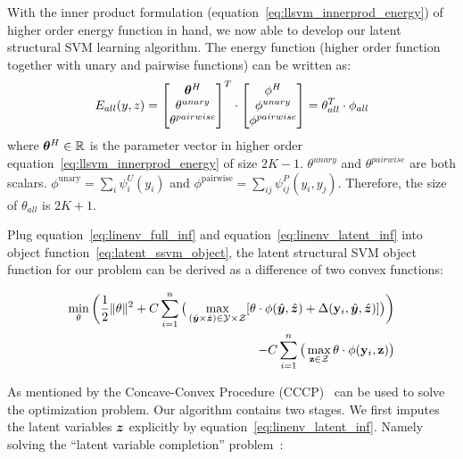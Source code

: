 With the inner product formulation
(equation~\eqref{eq:llsvm_innerprod_energy}) of higher order
energy function in hand, we now able to develop our latent
structural SVM learning algorithm. The energy function (higher
order function together with unary and pairwise functions) can be
written as:
\begin{equation}
  E_{all}(y,z) = \begin{bmatrix}
    {\bm{\theta}}^H\\
    \theta^{unary}\\
    \theta^{pairwise}
  \end{bmatrix}^T 
  \cdot \begin{bmatrix}
    \phi^H\\
    \phi^{unary}\\
    \phi^{pairwise}
  \end{bmatrix}=\theta_{all}^T\cdot\phi_{all}
\end{equation}
where ${\bm{\theta}}^H\in {\mathbb{R}}$ is the parameter vector in higher
order equation~\eqref{eq:llsvm_innerprod_energy} of size $2K-1$.
$\theta^{unary}$ and $\theta^{pairwise}$ are both scalars.
$\phi^\textrm{unary} = \sum_i \psi^U_i\!(y_i)$ and
$\phi^\textrm{pairwise} = \sum_{ij} \psi^P_{ij}(y_i, y_j)$.
Therefore, the size of $\theta_{all}$ is $2K+1$.

Plug equation~\eqref{eq:linenv_full_inf} and
equation~\eqref{eq:linenv_latent_inf} into object
function~\eqref{eq:latent_ssvm_object}, the latent structural SVM
object function for our problem can be derived as a difference of
two convex functions:

\begin{align}
\label{eq:lssvm_object}
  \min_\theta\bigg(\frac{1}{2}\|\theta\|^2+
  C\sum_{i=1}^{n}\big(\max_{(\hat{{\bm{y}}} \times
  \hat{{\bm{z}}}) \in \mathcal{Y} \times \mathcal{Z}}
  [\theta\cdot\phi(\hat{{\bm{y}}},\hat{{\bm{z}}}) +
  \Delta(\mathbf{y}_i,\hat{{\bm{y}}},\hat{{\bm{z}}})]\big)\bigg)\\
  -C\sum_{i=1}^{n}\big(\max_{\mathbf{z} \in \mathcal{Z}} \theta \cdot
  \phi(\mathbf{y}_i,\mathbf{z})\big)\nonumber
\end{align}

As mentioned by  the Concave-Convex
Procedure (CCCP)~\cite{yuille2002concave} can be used to solve the
optimization problem. Our algorithm contains two stages. We first
imputes the latent variables ${\bm{z}}$ explicitly by
equation~\eqref{eq:linenv_latent_inf}. Namely solving the
``latent variable completion'' problem~\cite{yu2009learning}:


